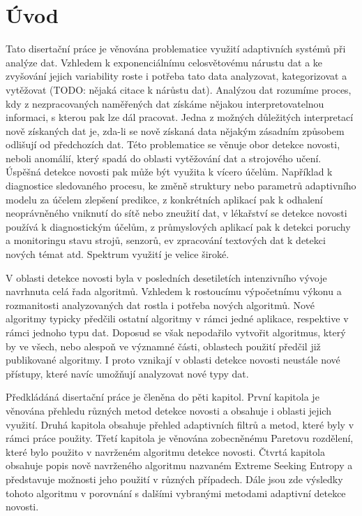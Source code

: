 \chapter*{Úvod}

Tato disertační práce je věnována problematice využití adaptivních systémů při analýze dat. Vzhledem k exponenciálnímu celosvětovému nárustu dat a ke zvyšování jejich variability roste i potřeba tato data analyzovat, kategorizovat a vytěžovat (TODO: nějaká citace k nárůstu dat). Analýzou dat rozumíme proces, kdy z nezpracovaných naměřených dat získáme nějakou interpretovatelnou informaci, s kterou pak lze dál pracovat. Jedna z možných důležitých interpretací nově získaných dat je, zda-li se nově získaná data nějakým zásadním způsobem odlišují od předchozích dat. Této problematice se věnuje obor detekce novosti, neboli anomálií, který spadá do oblasti vytěžování dat a strojového učení. Úspěšná detekce novosti pak může být využita k vícero účelům. Například k diagnostice sledovaného procesu, ke změně struktury nebo parametrů adaptivního modelu za účelem zlepšení predikce, z konkrétních aplikací pak k odhalení neoprávněného vniknutí do sítě nebo zneužití dat, v lékařství se detekce novosti používá k diagnostickým účelům, z průmyslových aplikací pak k detekci poruchy a monitoringu stavu strojů, senzorů, ev zpracování textových dat k detekci nových témat atd. Spektrum využití je velice široké.
\par
V oblasti detekce novosti byla v posledních desetiletích intenzivního vývoje navrhnuta celá řada algoritmů. Vzhledem k rostoucímu výpočetnímu výkonu a rozmanitosti analyzovaných dat rostla i potřeba nových algoritmů. Nové algoritmy typicky předčili ostatní algoritmy v rámci jedné aplikace, respektive v rámci jednoho typu dat.  Doposud se však nepodařilo vytvořit algoritmus, který by ve všech, nebo alespoň ve významné části, oblastech použití předčil již publikované algoritmy. I proto vznikají v oblasti detekce novosti neustále nové přístupy, které navíc umožňují analyzovat nové typy dat.

Předkládáná disertační práce je členěna do pěti kapitol. První kapitola je věnována přehledu různých metod detekce novosti a obsahuje i oblasti jejich využití. Druhá kapitola obsahuje přehled adaptivních filtrů a metod, které byly v rámci práce použity. Třetí kapitola je věnována zobecněnému Paretovu rozdělení, které bylo použito v navrženém algoritmu detekce novosti. Čtvrtá kapitola obsahuje popis nově navrženého algoritmu nazvaném Extreme Seeking Entropy a představuje možnosti jeho použití v různých případech. Dále jsou zde výsledky tohoto algoritmu v porovnání s dalšími vybranými metodami adaptivní detekce novosti. 